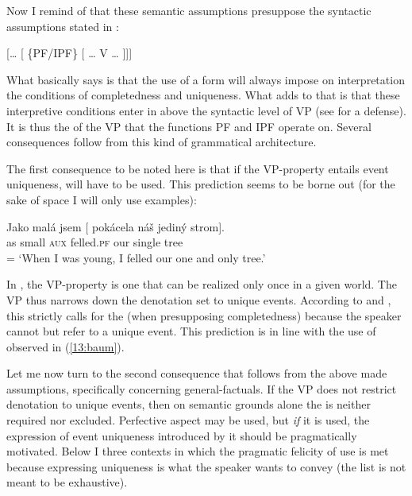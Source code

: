 \documentclass[output=paper,modfonts,newtxmath,hidelinks]{langscibook}
\begin{document}
\noindent Now I remind of that these semantic assumptions presuppose the syntactic assumptions stated in :

\begin{exe}
\ex\label{13:synas}
{} [{\dots} [ \{PF/IPF\} [ {\dots} V {\dots} ]]]
\end{exe}

\noindent What  basically says is that the use of a  form will always impose on interpretation the conditions of completedness
and uniqueness. What  adds to that is that these interpretive conditions enter in above the syntactic level of VP (see \citealt{Tate11,Tate13} for a defense). It is thus the  of the VP that the functions PF and IPF operate on. Several consequences follow from this kind of grammatical architecture.

The first consequence to be noted here is that if the VP-property entails event uniqueness,  will have to be used.
This prediction seems to be borne out (for the sake of space I will only use  examples):

\begin{exe}
\ex\label{13:baum}
\gll Jako mal\'a jsem [ pok\'acela n\'a\v{s} jedin\'y strom].\\
as small \textsc{aux} {} felled.\textsc{pf} our single tree \\\hfill = 
\glt `When I was young, I felled our one and only tree.'
\end{exe}

\noindent In , the VP-property is one that can be realized only once in a given world. The VP thus narrows down the denotation set to unique events. According to  and , this strictly calls for the  (when presupposing completedness) because the speaker cannot but refer to a unique event. This prediction is in line with the use of  observed in (\ref{13:baum}).


Let me now turn to the second consequence that follows from the above made assumptions, specifically concerning general-factuals. If the VP does not restrict denotation to unique events, then on semantic grounds alone the  is neither required nor excluded. Perfective aspect may be used, but \textit{if} it is used, the expression of event uniqueness introduced by it should be pragmatically motivated. Below I  three contexts in which the pragmatic felicity of  use is met because expressing uniqueness is what the speaker wants to convey (the list is not meant to be exhaustive).
\end{document}
